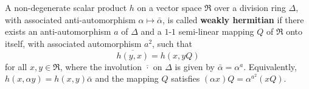 A non-degenerate scalar product $h$ on a vector space $\mathfrak{R}$ over a division ring $\Delta$, with associated anti-automorphism $\alpha \mapsto \bar{\alpha}$, is called \textbf{weakly hermitian} if there exists an anti-automorphism $a$ of $\Delta$ and a $1$-$1$ semi-linear mapping $Q$ of $\mathfrak{R}$ onto itself, with associated automorphism $a^2$, such that
$$\overline{h(y, x)} = h(x, yQ)$$
for all $x, y \in \mathfrak{R}$, where the involution $\overline{\cdot}$ on $\Delta$ is given by $\bar{\alpha} = \alpha^a$. Equivalently, $h(x, \alpha y) = h(x, y)\bar{\alpha}$ and the mapping $Q$ satisfies $(\alpha x)Q = \alpha^{a^2}(xQ)$.
